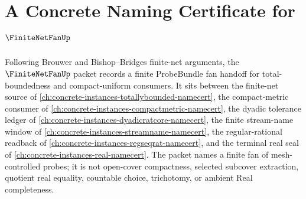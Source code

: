 \chapter{A Concrete Naming Certificate for $\FiniteNetFanUp$}
\label{ch:concrete-instances-finite-net-fan-namecert}

Following Brouwer and Bishop--Bridges finite-net arguments, the $\FiniteNetFanUp$ packet records a finite ProbeBundle fan handoff for total-boundedness and compact-uniform consumers. It sits between the finite-net source of \autoref{ch:concrete-instances-totallybounded-namecert}, the compact-metric consumer of \autoref{ch:concrete-instances-compactmetric-namecert}, the dyadic tolerance ledger of \autoref{ch:concrete-instances-dyadicratcore-namecert}, the finite stream-name window of \autoref{ch:concrete-instances-streamname-namecert}, the regular-rational readback of \autoref{ch:concrete-instances-regseqrat-namecert}, and the terminal real seal of \autoref{ch:concrete-instances-real-namecert}. The packet names a finite fan of mesh-controlled probes; it is not open-cover compactness, selected subcover extraction, quotient real equality, countable choice, trichotomy, or ambient Real completeness.

